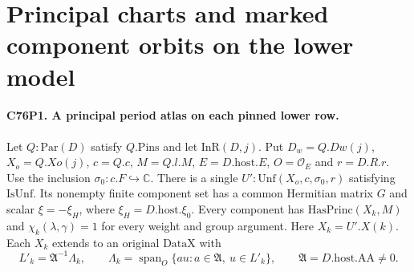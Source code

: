 \section{Principal charts and marked component orbits on the lower model}

\paragraph{C76P1. A principal period atlas on each pinned lower row.}
Let $Q:\mathrm{Par}(D)$ satisfy $Q.\mathrm{Pins}$ and let
$\mathrm{InR}(D,j)$. Put $D_w=Q.Dw(j)$, $X_o=Q.Xo(j)$, $c=Q.c$,
$M=Q.l.M$, $E=D.\mathrm{host}.E$, $O=\mathcal O_E$ and $r=D.R.r$.
Use the inclusion $\sigma_0:c.F\hookrightarrow\mathbb C$.
There is a single $U':\mathrm{Unf}(X_o,c,\sigma_0,r)$ satisfying
$\mathrm{IsUnf}$. Its nonempty finite component set has a common
Hermitian matrix $G$ and scalar $\xi=-\xi_H$, where
$\xi_H=D.\mathrm{host}.\xi_0$. Every component has
$\mathrm{HasPrinc}(X_k,M)$ and $\chi_k(\lambda,\gamma)=1$ for
every weight and group argument. Here $X_k=U'.X(k)$.
Each $X_k$ extends to an original $\mathrm{DataX}$ with
\[
 L'_k=\mathfrak A^{-1}\Lambda_k,\qquad
 \Lambda_k=\operatorname{span}_O\{a u:a\in\mathfrak A,\ u\in L'_k\},
 \qquad \mathfrak A=D.\mathrm{host}.\mathrm{AA}\ne0 .
\]

